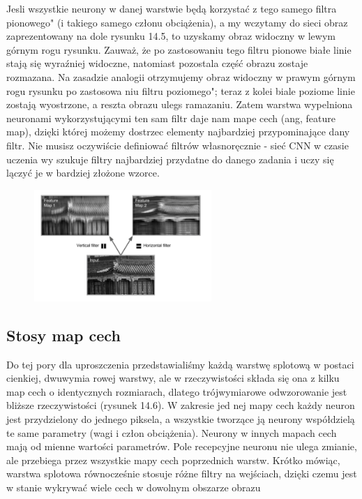 \documentclass{article}
\begin{document}
Jesli wszystkie neurony w danej warstwie będą korzystać z tego samego filtra pionowego" (i takiego
samego członu obciążenia), a my wczytamy do sieci obraz zaprezentowany na dole rysunku 14.5,
to uzyskamy obraz widoczny w lewym górnym rogu rysunku. Zauważ, że po zastosowaniu tego filtru
pionowe białe linie stają się wyraźniej widoczne, natomiast pozostala część obrazu zostaje rozmazana.
Na zasadzie analogii otrzymujemy obraz widoczny w prawym górnym rogu rysunku po zastosowa
niu filtru poziomego"; teraz z kolei biale poziome linie zostają wyostrzone, a reszta obrazu ulegs
ramazaniu. Zatem warstwa wypelniona neuronami wykorzystującymi ten sam filtr daje nam mape
cech (ang, feature map), dzięki której możemy dostrzec elementy najbardziej przypominające dany
filtr. Nie musisz oczywiście definiować filtrów własnoręcznie - sieć CNN w czasie uczenia wy
szukuje filtry najbardziej przydatne do danego zadania i uczy się lączyć je w bardziej złożone
wzorce. \cite{geron}
\begin{figure}[H]
	\centering
	\includegraphics[width=0.6\textwidth,keepaspectratio=true]{filters}
	\caption{}
\end{figure}

\subsection{Stosy map cech}
Do tej pory dla uproszczenia przedstawialiśmy każdą warstwę splotową w postaci cienkiej, dwuwymia rowej warstwy, ale w rzeczywistości składa się ona z kilku map cech o identycznych rozmiarach, dlatego trójwymiarowe odwzorowanie jest bliższe rzeczywistości (rysunek 14.6). W zakresie jed nej mapy cech każdy neuron jest przydzielony do jednego piksela, a wszystkie tworzące ją neurony współdzielą te same parametry (wagi i człon obciążenia). Neurony w innych mapach cech mają od mienne wartości parametrów. Pole recepcyjne neuronu nie ulega zmianie, ale przebiega przez wszystkie mapy cech poprzednich warstw. Krótko mówiąc, warstwa splotowa równocześnie stosuje różne filtry na wejściach, dzięki czemu jest w stanie wykrywać wiele cech w dowolnym obszarze obrazu \cite{geron}
\end{document}
